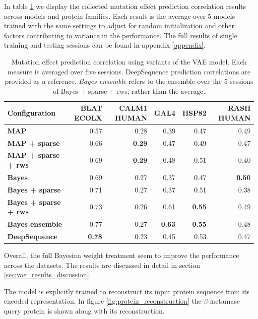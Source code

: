 In table \ref{tab:vae_results} we display the collected mutation effect prediction correlation results across models and protein families. Each result is the average over 5 models trained with the same settings to adjust for random initialization and other factors contributing to variance in the performance. The full results of single training and testing sessions can be found in appendix \ref{appendix}.
\begin{table}[H]
    \centering
    \begin{tabularx}{\textwidth}{lrrrrr}
    \hline
    \textbf{Configuration} & \textbf{BLAT ECOLX} & \textbf{CALM1 HUMAN} & \textbf{GAL4} & \textbf{HSP82} & \textbf{RASH HUMAN} \\ \hline
    \textbf{MAP} & 0.57 & 0.28 & 0.39 & 0.47 & 0.49 \\
    \textbf{MAP + sparse} & 0.66 & \textbf{0.29} & 0.47 & 0.49 & 0.47 \\
    \textbf{MAP + sparse + rws} & 0.69 & \textbf{0.29} & 0.48 & 0.51 & 0.40 \\
    \textbf{Bayes} & 0.69 & 0.27 & 0.37 & 0.47 & \textbf{0.50} \\
    \textbf{Bayes + sparse} & 0.71 & 0.27 & 0.37 & 0.51 & 0.38 \\
    \textbf{Bayes + sparse + rws} & 0.73 & 0.26 & 0.61 & \textbf{0.55} & 0.49 \\
    \textbf{Bayes ensemble} & 0.77 & 0.27 & \textbf{0.63} & \textbf{0.55} & 0.48 \\
    \hline
    \textbf{DeepSequence \cite{riesselman2018deep}} & \textbf{0.78} & 0.23 & 0.45 & 0.53 & 0.47 \\
    \hline
    \end{tabularx}
    \caption{Mutation effect prediction correlation using variants of the VAE model. Each measure is averaged over five sessions. DeepSequence prediction correlations are provided as a reference. \textit{Bayes ensemble} refers to the ensemble over the 5 sessions of Bayes + sparse + rws, rather than the average.}
    \label{tab:vae_results}
\end{table}

Overall, the full Bayesian weight treatment seem to improve the performance across the datasets. The results are discussed in detail in section \ref{sec:vae_results_discussion}.

The model is explicitly trained to reconstruct its input protein sequence from its encoded representation. In figure \ref{fig:protein_reconstruction} the $\beta$-lactamase query protein is shown along with its reconstruction.


